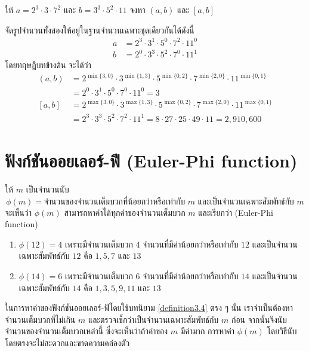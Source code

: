 \begin{examplebox}
	ให้ $a = 2^3 \cdot 3 \cdot 7^2$ และ $b = 3^3 \cdot 5^2 \cdot 11$ จงหา $(a, b)$ และ $[a, b]$ 
\end{examplebox}
	\solution จัดรูปจำนวนทั้งสองให้อยู่ในฐานจำนวนเฉพาะชุดเดียวกันได้ดังนี้
\begin{align*}
	a &= 2^3 \cdot 3^1 \cdot 5^0 \cdot 7^2 \cdot 11^0 \\
	b &= 2^0 \cdot 3^3 \cdot 5^2 \cdot 7^0 \cdot 11^1
\end{align*}
โดยทฤษฎีบทข้างต้น จะได้ว่า
\begin{align*}
	(a, b) &= 2^{\min\{3,0\}} \cdot 3^{\min\{1,3\}} \cdot 5^{\min\{0,2\}} \cdot 7^{\min\{2,0\}} \cdot 11^{\min\{0,1\}} \\
	&= 2^0 \cdot 3^1 \cdot 5^0 \cdot 7^0 \cdot 11^0 = 3 \\[0.5em]
	[a, b] &= 2^{\max\{3,0\}} \cdot 3^{\max\{1,3\}} \cdot 5^{\max\{0,2\}} \cdot 7^{\max\{2,0\}} \cdot 11^{\max\{0,1\}} \\
	&= 2^3 \cdot 3^3 \cdot 5^2 \cdot 7^2 \cdot 11^1 = 8 \cdot 27 \cdot 25 \cdot 49 \cdot 11 = 2,910,600
\end{align*}

\newpage
\section{ฟังก์ชันออยเลอร์-ฟี (Euler-Phi function) }

\begin{definitionbox} \label{definition3.4}
	ให้ $m$ เป็นจำนวนนับ
	\[
	\phi(m)=\text{จำนวนของจำนวนเต็มบวกที่น้อยกว่าหรือเท่ากับ $m$ และเป็นจำนวนเฉพาะสัมพัทธ์กับ $m$}
	\] 
จะเห็นว่า $\phi(m)$ สามารถหาค่าได้ทุกค่าของจำนวนเต็มบวก $m$ และเรียกว่า  (Euler-Phi function)
\end{definitionbox}

\begin{examplebox}
	\begin{enumerate}
		\item $\phi(12)=4$ เพราะมีจำนวนเต็มบวก $4$ จำนวนที่มีค่าน้อยกว่าหรือเท่ากับ $12$ และเป็นจำนวนเฉพาะสัมพัทธ์กับ $12$ คือ $1,5,7$ และ $13$
		\item  $\phi(14)=6$ เพราะมีจำนวนเต็มบวก $6$ จำนวนที่มีค่าน้อยกว่าหรือเท่ากับ $14$ และเป็นจำนวนเฉพาะสัมพัทธ์กับ $14$ คือ $1,3,5,9,11$ และ $13$ 
	\end{enumerate}   
\end{examplebox}

\newpage
\remark ในการหาค่าของฟังก์ชันออยเลอร์-ฟีโดยใช้บทนิยาม \ref{definition3.4} ตรง ๆ นั้น เราจำเป็นต้องหาจำนวนเต็มบวกที่ไม่เกิน $m$ และตรวจเช็กว่าเป็นจำนวนเฉพาะสัมพัทธ์กับ $m$ ก่อน จากนั้นจึงนับจำนวนของจำนวนเต็มบวกเหล่านี้ ซึ่งจะเห็นว่าถ้าค่าของ $m$ มีค่ามาก การหาค่า $\phi(m)$ โดยวิธีนับโดยตรงจะไม่สะดวกและขาดความคล่องตัว 

